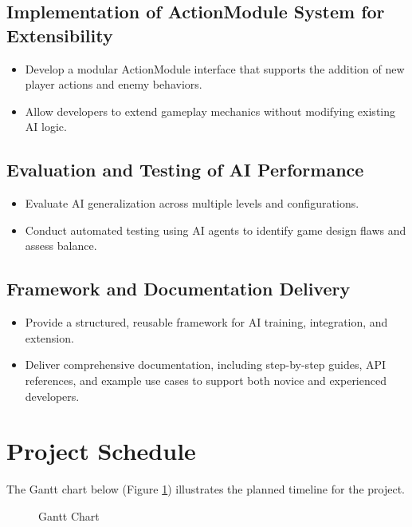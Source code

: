 \documentclass[12pt,oneside,openright,a4paper]{cpe-english-project}
\begin{document}
\subsection{Implementation of ActionModule System for Extensibility}
\begin{itemize}
\item Develop a modular ActionModule interface that supports the addition of new player actions and enemy behaviors.
\item Allow developers to extend gameplay mechanics without modifying existing AI logic.
\end{itemize}
\subsection{Evaluation and Testing of AI Performance}
\begin{itemize}
\item Evaluate AI generalization across multiple levels and configurations.
\item Conduct automated testing using AI agents to identify game design flaws and assess balance.
\end{itemize}
\subsection{Framework and Documentation Delivery}
\begin{itemize}
\item Provide a structured, reusable framework for AI training, integration, and extension.
\item Deliver comprehensive documentation, including step-by-step guides, API references, and example use cases to support both novice and experienced developers.
\end{itemize}
\section{Project Schedule}
The Gantt chart below (Figure \ref{fig:Gantt Chart}) illustrates the planned timeline for the project.
\begin{figure}[!h]
\centering
{}
\caption{Gantt Chart}\label{fig:Gantt Chart}
\end{figure}
\end{document}
